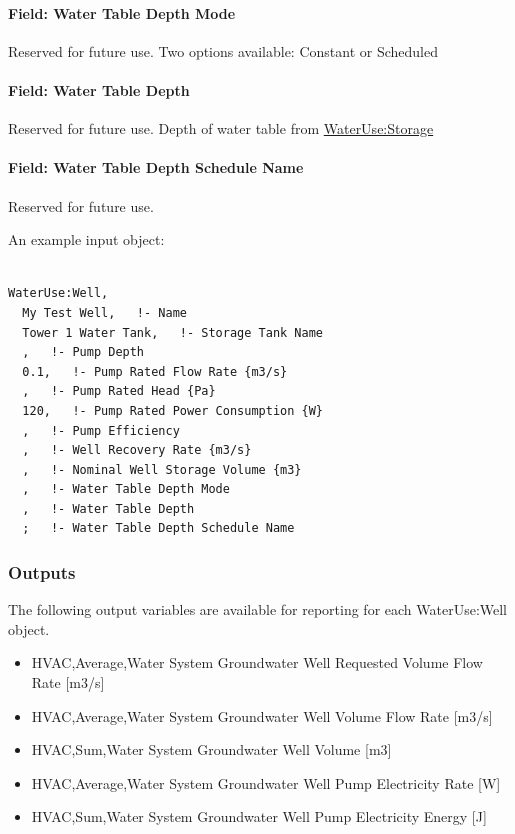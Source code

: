 \paragraph{Field: Water Table Depth Mode}\label{field-water-table-depth-mode}

Reserved for future use. Two options available: Constant or Scheduled

\paragraph{Field: Water Table Depth}\label{field-water-table-depth}

Reserved for future use. Depth of water table from \hyperref[waterusestorage]{WaterUse:Storage}

\paragraph{Field: Water Table Depth Schedule Name}\label{field-water-table-depth-schedule-name}

Reserved for future use.

An example input object:

\begin{lstlisting}

WaterUse:Well,
  My Test Well,   !- Name
  Tower 1 Water Tank,   !- Storage Tank Name
  ,   !- Pump Depth
  0.1,   !- Pump Rated Flow Rate {m3/s}
  ,   !- Pump Rated Head {Pa}
  120,   !- Pump Rated Power Consumption {W}
  ,   !- Pump Efficiency
  ,   !- Well Recovery Rate {m3/s}
  ,   !- Nominal Well Storage Volume {m3}
  ,   !- Water Table Depth Mode
  ,   !- Water Table Depth
  ;   !- Water Table Depth Schedule Name
\end{lstlisting}

\subsubsection{Outputs}\label{outputs-4-019}

The following output variables are available for reporting for each WaterUse:Well object.

\begin{itemize}
\item
  HVAC,Average,Water System Groundwater Well Requested Volume Flow Rate {[}m3/s{]}
\item
  HVAC,Average,Water System Groundwater Well Volume Flow Rate {[}m3/s{]}
\item
  HVAC,Sum,Water System Groundwater Well Volume {[}m3{]}
\item
  HVAC,Average,Water System Groundwater Well Pump Electricity Rate {[}W{]}
\item
  HVAC,Sum,Water System Groundwater Well Pump Electricity Energy {[}J{]}
\end{itemize}

